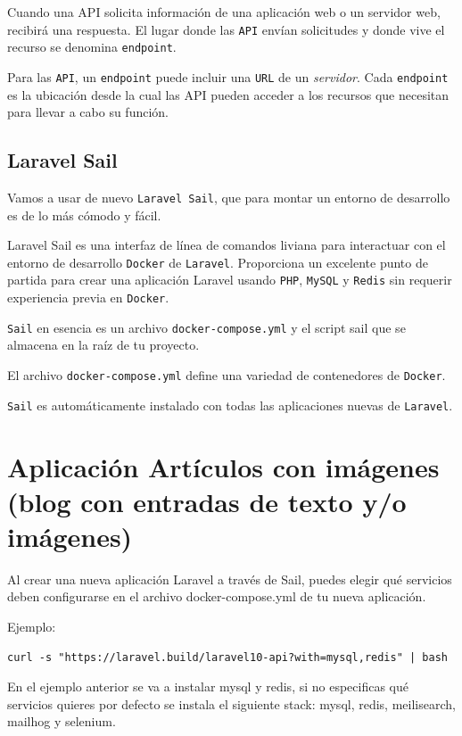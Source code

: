 \documentclass[11pt]{article}
\begin{document}
Cuando una API solicita información de una aplicación web o un
servidor web, recibirá una respuesta. El lugar donde las \texttt{API} envían
solicitudes y donde vive el recurso se denomina \texttt{endpoint}.

Para las \texttt{API}, un \texttt{endpoint} puede incluir una \texttt{URL} de un
\emph{servidor}. Cada \texttt{endpoint} es la ubicación desde la cual las API pueden
acceder a los recursos que necesitan para llevar a cabo su función.

\subsection{Laravel Sail}
\label{sec:org1e712c0}
Vamos a usar de nuevo \texttt{Laravel Sail}, que para montar un entorno de
desarrollo es de lo más cómodo y fácil.

Laravel Sail es una interfaz de línea de comandos liviana para
interactuar con el entorno de desarrollo \texttt{Docker} de
\texttt{Laravel}. Proporciona un excelente punto de partida para crear una
aplicación Laravel usando \texttt{PHP}, \texttt{MySQL} y \texttt{Redis} sin requerir
experiencia previa en \texttt{Docker}.

\texttt{Sail} en esencia es un archivo \texttt{docker-compose.yml} y el script sail
que se almacena en la raíz de tu proyecto.

El archivo \texttt{docker-compose.yml} define una variedad de contenedores de
\texttt{Docker}.

\texttt{Sail} es automáticamente instalado con todas las aplicaciones nuevas de
\texttt{Laravel}.


\section{Aplicación Artículos con imágenes (blog con entradas de texto y/o imágenes)}
\label{sec:orgc58cf27}
Al crear una nueva aplicación Laravel a través de Sail, puedes elegir
qué servicios deben configurarse en el archivo docker-compose.yml de
tu nueva aplicación.

Ejemplo:
\begin{verbatim}
curl -s "https://laravel.build/laravel10-api?with=mysql,redis" | bash
\end{verbatim}

En el ejemplo anterior se va a instalar mysql y redis, si no
especificas qué servicios quieres por defecto se instala el siguiente
stack: mysql, redis, meilisearch, mailhog y selenium.
\end{document}
